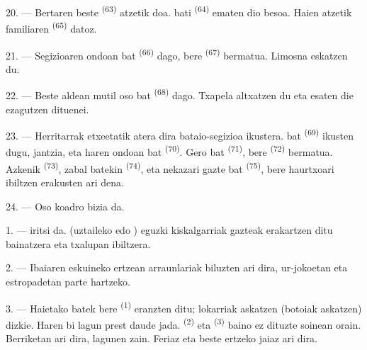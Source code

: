 20. --- Bertaren beste  \textsuperscript{(63)} atzetik doa.
 bati \textsuperscript{(64)} ematen dio besoa. Haien atzetik
familiaren  \textsuperscript{(65)} datoz.

\VUsaut{4.6mm}
\VUsaut{3.4mm}

21. --- Segizioaren ondoan  bat \textsuperscript{(66)} dago, bere
 \textsuperscript{(67)} bermatua. Limosna eskatzen du.

22. --- Beste aldean mutil oso  bat \textsuperscript{(68)} dago.
Txapela altxatzen du eta  esaten die ezagutzen dituenei.

23. --- Herritarrak etxeetatik atera dira bataio-segizioa ikustera.
 bat \textsuperscript{(69)} ikusten dugu,  jantzia, eta haren ondoan  bat
\textsuperscript{(70)}. Gero  bat \textsuperscript{(71)},
bere  \textsuperscript{(72)} bermatua. Azkenik 
\textsuperscript{(73)},  zabal batekin
\textsuperscript{(74)}, eta nekazari gazte bat 
\textsuperscript{(75)}, bere haurtxoari ibiltzen erakusten ari dena.

24. --- Oso koadro bizia da.
\VUsaut{4.0mm}

\VUsaut{3.0mm}

\VUsaut{2.4mm}

\VUsaut{3.0mm}

1. ---  iritsi da.  (uztaileko edo )
eguzki kiskalgarriak gazteak erakartzen ditu bainatzera eta txalupan ibiltzera.

2. --- Ibaiaren eskuineko ertzean arraunlariak biluzten ari dira, ur-jokoetan eta
estropadetan parte hartzeko.

3. --- Haietako batek bere  \textsuperscript{(1)} eranzten
ditu; lokarriak askatzen (botoiak askatzen) dizkie. Haren bi lagun prest daude
jada.  \textsuperscript{(2)} eta 
\textsuperscript{(3)} baino ez dituzte soinean orain. Berriketan ari dira,
lagunen zain. Feriaz eta beste ertzeko jaiaz ari dira.

